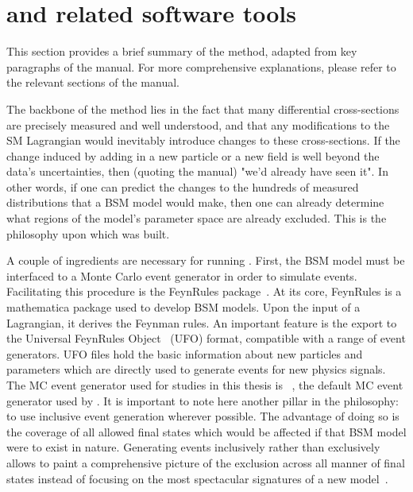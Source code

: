 \section{\contur and related software tools}
\label{sec:reinterpretsoftware}
This section provides a brief summary of the \contur method, adapted from key paragraphs of the manual. For more comprehensive explanations, please refer to the relevant sections of the manual.

The backbone of the \contur method lies in the fact that many differential cross-sections are precisely measured and well understood, and that any modifications to the SM Lagrangian would inevitably introduce changes to these cross-sections. If the change induced by adding in a new particle or a new field is well beyond the data's uncertainties, then (quoting the manual) "we'd already have seen it". In other words, if one can predict the changes to the hundreds of \LHC measured distributions that a BSM model would make, then one can already determine what regions of the model's parameter space are already excluded. This is the philosophy upon which \contur was built. 

A couple of ingredients are necessary for running \contur. First, the BSM model must be interfaced to a Monte Carlo event generator in order to simulate events. Facilitating this procedure is the FeynRules package~\cite{Alloul:2013bka}. At its core, FeynRules is a mathematica package used to develop BSM models. Upon the input of a Lagrangian, it derives the Feynman rules. An important feature is the export to the Universal FeynRules Object~\cite{Degrande:2011ua} (UFO) format, compatible with a range of event generators. UFO files hold the basic information about new particles and parameters which are directly used to generate events for new physics signals. The MC event generator used for studies in this thesis is \herwig~\cite{Bahr:2008pv}, the default MC event generator used by \contur. It is important to note here another pillar in the \contur philosophy: to use inclusive event generation wherever possible. The advantage of doing so is the coverage of all allowed final states which would be affected if that BSM model were to exist in nature. Generating events inclusively rather than exclusively allows \contur to paint a comprehensive picture of the exclusion across all manner of final states instead of focusing on the most spectacular signatures of a new model~\cite{conturmanual}. 

